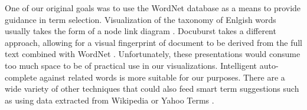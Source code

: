 One of our original goals was to use the WordNet database as a means to provide guidance in term selection.  Visualization of the taxonomy of Enlgish words usually takes the form of a node link diagram \cite{collins2006wordnet,wordvis}.  Docuburst takes a different approach, allowing for a visual fingerprint of document to be derived from the full text combined with WordNet \cite{fellbaum2010wordnet}.  Unfortunately, these presentations would consume too much space to be of practical use in our visualizations.  Intelligent auto-complete against related words is more suitable for our purposes.  There are a wide variety of other techniques that could also feed smart term suggestions such as using data extracted from Wikipedia or Yahoo Terms \cite{dakka2008automatic}.
